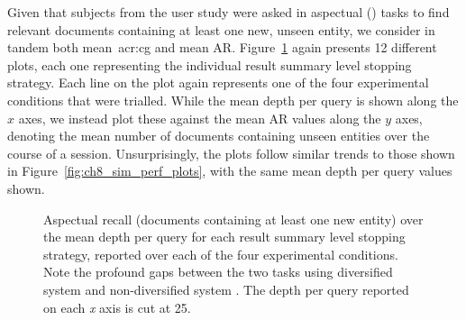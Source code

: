 Given that subjects from the user study were asked in aspectual () tasks to find relevant documents containing at least one new, unseen entity, we consider in tandem both mean~\gls{acr:cg} and mean AR. Figure~\ref{fig:ch8_sim_ar_plots} again presents 12 different plots, each one representing the individual result summary level stopping strategy. Each line on the plot again represents one of the four experimental conditions that were trialled. While the mean depth per query is shown along the $x$ axes, we instead plot these against the mean AR values along the $y$ axes, denoting the mean number of documents containing unseen entities over the course of a session. Unsurprisingly, the plots follow similar trends to those shown in Figure~\ref{fig:ch8_sim_perf_plots}, with the same mean depth per query values shown.

\begin{figure}[p!]
    \centering
    \caption[AR \emph{what-if} performance plots]{Aspectual recall (documents containing at least one new entity) over the mean depth per query for each result summary level stopping strategy, reported over each of the four experimental conditions. Note the profound gaps between the two tasks using diversified system  and non-diversified system . The depth per query reported on each \emph{x} axis is cut at 25.}
    \label{fig:ch8_sim_ar_plots}
\end{figure}

